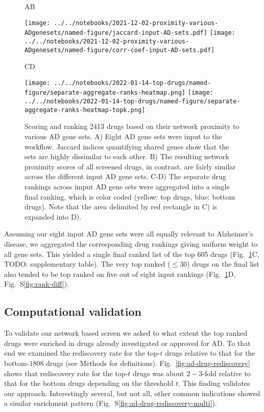 \documentclass[letterpaper]{article}
\begin{document}
\begin{figure}
\hspace{0.05\textwidth}A\hspace{0.7\textwidth}B

\texttt{[image: ../../notebooks/2021-12-02-proximity-various-ADgenesets/named-figure/jaccard-input-AD-sets.pdf]}
\texttt{[image: ../../notebooks/2021-12-02-proximity-various-ADgenesets/named-figure/corr-coef-input-AD-sets.pdf]}

\hspace{0.05\textwidth}C\hspace{0.5\textwidth}D

\texttt{[image: ../../notebooks/2022-01-14-top-drugs/named-figure/separate-aggregate-ranks-heatmap.png]}
\texttt{[image: ../../notebooks/2022-01-14-top-drugs/named-figure/separate-aggregate-ranks-heatmap-topk.png]}

\caption{Scoring and ranking 2413 drugs based on their network proximity to
  various AD gene sets.  A) Eight AD gene sets were input to the workflow.
  Jaccard indices quantifying shared genes show that the sets are highly
  dissimilar to each other.  B) The resulting network proximity scores of all
  screened drugs, in contrast, are fairly similar across the different input
  AD gene sets.  C-D) The separate drug rankings across imput AD gene sets
  were aggregated into a single final ranking, which is color coded (yellow:
  top drugs, blue: bottom drugs).  Note that the area delimited by red
  rectangle in C) is expanded into D).
}
\label{fig:screen}
\end{figure}

Assuming our eight input AD gene sets were all equally relevant to Alzheimer's
disease, we aggregated the corresponding drug rankings giving uniform weight
to all gene sets.  This yielded a single final ranked list of the top 605
drugs (Fig.~\ref{fig:screen}C, TODO: supplementary table).  The very top
ranked ($\le 30$) drugs on the final list also tended to be top ranked on five
out of eight input rankings (Fig.~\ref{fig:screen}D,
Fig.~S\ref{fig:rank-diff}).

\subsection{Computational validation}

To validate our network based screen we asked to what extent the top ranked
drugs were enriched in drugs already investigated or approved for AD.  To that
end we examined the rediscovery rate for the top-$t$ drugs relative to that
for the bottom-$1808$ drugs (see Methods for definitions).
Fig.~\ref{fig:ad-drug-rediscovery} shows that rediscovery rate for the top-$t$
drugs was about $2-3$-fold relative to that for the bottom drugs depending on
the threshold $t$.  This finding validates our approach.  Interestingly several, but
not all, other common indications showed a similar enrichment pattern
(Fig.~S\ref{fig:ad-drug-rediscovery-multi}).
\end{document}

